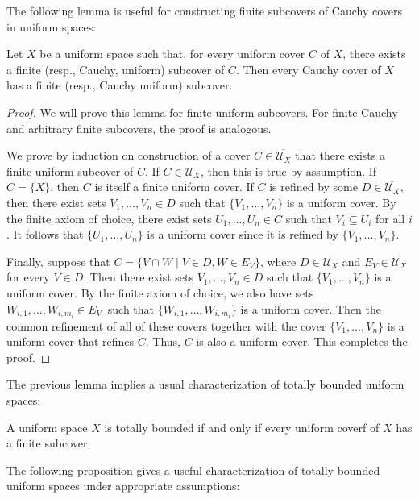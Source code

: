 \documentclass[reqno]{amsart}
\theoremstyle{definition}
\theoremstyle{remark}
\numberwithin{figure}{section}
\begin{document}
The following lemma is useful for constructing finite subcovers of Cauchy covers in uniform spaces:

\begin{lem}[tb-aux]
Let $X$ be a uniform space such that, for every uniform cover $C$ of $X$, there exists a finite (resp., Cauchy, uniform) subcover of $C$.
Then every Cauchy cover of $X$ has a finite (resp., Cauchy uniform) subcover.
\end{lem}
\begin{proof}
We will prove this lemma for finite uniform subcovers.
For finite Cauchy and arbitrary finite subcovers, the proof is analogous.

We prove by induction on construction of a cover $C \in \overline{\mathcal{U}_X}$ that there exists a finite uniform subcover of $C$.
If $C \in \mathcal{U}_X$, then this is true by assumption.
If $C = \{ X \}$, then $C$ is itself a finite uniform cover.
If $C$ is refined by some $D \in \overline{\mathcal{U}_X}$, then there exist sets $V_1, \ldots, V_n \in D$ such that $\{ V_1, \ldots, V_n \}$ is a uniform cover.
By the finite axiom of choice, there exist sets $U_1, \ldots, U_n \in C$ such that $V_i \subseteq U_i$ for all $i$.
It follows that $\{ U_1, \ldots, U_n \}$ is a uniform cover since it is refined by $\{ V_1, \ldots, V_n \}$.

Finally, suppose that $C = \{ V \cap W \mid V \in D, W \in E_V \}$, where $D \in \overline{\mathcal{U}_X}$ and $E_V \in \overline{\mathcal{U}_X}$ for every $V \in D$.
Then there exist sets $V_1, \ldots, V_n \in D$ such that $\{ V_1, \ldots, V_n \}$ is a uniform cover.
By the finite axiom of choice, we also have sets $W_{i,1}, \ldots, W_{i,m_i} \in E_{V_i}$ such that $\{ W_{i,1}, \ldots, W_{i,m_i} \}$ is a uniform cover.
Then the common refinement of all of these covers together with the cover $\{ V_1, \ldots, V_n \}$ is a uniform cover that refines $C$.
Thus, $C$ is also a uniform cover.
This completes the proof.
\end{proof}

The previous lemma implies a usual characterization of totally bounded uniform spaces:

\begin{cor}
A uniform space $X$ is totally bounded if and only if every uniform coverf of $X$ has a finite subcover.
\end{cor}

The following proposition gives a useful characterization of totally bounded uniform spaces under appropriate assumptions:
\end{document}

